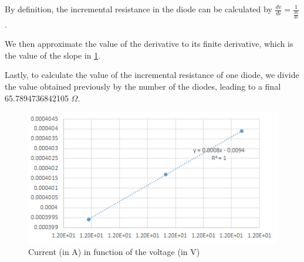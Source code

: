 By definition, the incremental resistance in the diode can be calculated by $\frac{dv}{di} = \frac{1}{\frac{di}{dv}}$.

We then approximate the value of the derivative to its finite derivative, which is the value of the slope in \ref{fig:Rd}.

Lastly, to calculate the value of the incremental resistance of one diode, we divide the value obtained previously by the number of the diodes, leading to a final 65.7894736842105 $\Omega$.




\begin{figure}[!htb]
    \centering
      \includegraphics[width=.6\columnwidth]{Rd.png}
      \caption{Current (in A) in function of the voltage (in V)}
      \label{fig:Rd}
\end{figure}
